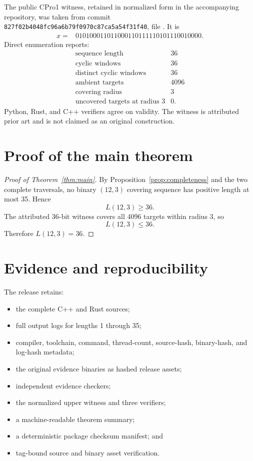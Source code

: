 \documentclass[11pt]{article}
\begin{document}
The public CPro1 witness, retained in normalized form in the accompanying
repository, was taken from commit
\texttt{827f02b4048fc96a6b79f0970c87ca5a54f31f40}, file
. It is
\[
\begin{split}
  x={}&010100011011000110111110101110010000.
\end{split}
\]
Direct enumeration reports:
\[
\begin{array}{lr}
\text{sequence length} & 36\\
\text{cyclic windows} & 36\\
\text{distinct cyclic windows} & 36\\
\text{ambient targets} & 4096\\
\text{covering radius} & 3\\
\text{uncovered targets at radius 3} & 0.
\end{array}
\]
Python, Rust, and C++ verifiers agree on validity. The witness is attributed
prior art and is not claimed as an original construction.

\section{Proof of the main theorem}

\begin{proof}[Proof of Theorem~\ref{thm:main}]
By Proposition~\ref{prop:completeness} and the two complete traversals, no
binary \((12,3)\) covering sequence has positive length at most 35. Hence
\[
  L(12,3)\geq 36.
\]
The attributed 36-bit witness covers all 4096 targets within radius 3, so
\[
  L(12,3)\leq 36.
\]
Therefore \(L(12,3)=36\).
\end{proof}

\section{Evidence and reproducibility}

The release retains:
\begin{itemize}
\item the complete C++ and Rust sources;
\item full output logs for lengths 1 through 35;
\item compiler, toolchain, command, thread-count, source-hash, binary-hash,
      and log-hash metadata;
\item the original evidence binaries as hashed release assets;
\item independent evidence checkers;
\item the normalized upper witness and three verifiers;
\item a machine-readable theorem summary;
\item a deterministic package checksum manifest; and
\item tag-bound source and binary asset verification.
\end{itemize}
\end{document}
